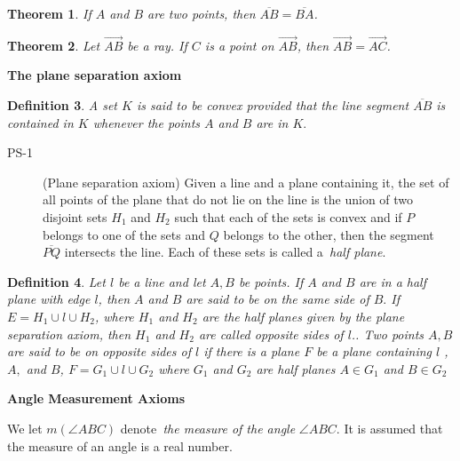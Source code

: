 \documentclass[12pt]{article}
\newtheorem{theorem}{Theorem}
\newtheorem{definition}[theorem]{Definition}
\begin{document}
\begin{theorem}
If $A$ and $B$ are two points, then $\overline{AB}=\overline{BA}$.
\end{theorem}

\begin{theorem}
Let $\overrightarrow{AB}$ be a ray. If $C$ is a point on $\overrightarrow{AB}
$, then $\overrightarrow{AB}=\overrightarrow{AC}$.\medskip 
\end{theorem}

\textbf{The plane separation axiom\smallskip }

\begin{definition}
A set $K$ is said to be \emph{convex} provided that the line segment $%
\overline{AB}$ is contained in $K$ whenever the points $A$ and $B$ are in $K.
$
\end{definition}

\begin{description}
\item[PS-1]  (Plane separation axiom) Given a line and a plane containing
it, the set of all points of the plane that do not lie on the line is the
union of two disjoint sets $H_{1}$ and $H_{2}$ such that each of the sets is
convex and if $P$ belongs to one of the sets and $Q$ belongs to the other,
then the segment $\overline{PQ}$ intersects the line. Each of these sets is
called a\emph{\ half plane}.
\end{description}

\begin{definition}
Let $l$ be a line and let $A,B$ be points. If $A$ and $B$ are in a half
plane with edge $l$, then $A$ and $B$ are said to be on the same side of $B.$
If $E=H_{1}\cup l\cup H_{2}$, where $H_{1}$ and $H_{2}$ are the half planes
given by the plane separation axiom, then $H_{1}$ and $H_{2}$ are called
opposite sides of $l$.. Two points $A,B$ are said to be on opposite sides of 
$l$ if there is a plane $F$ be a plane containing $l$ , $A,$ and $B$, $%
F=G_{1}\cup l\cup G_{2}$ where $G_{1}$ and $G_{2}$ are half planes $A\in
G_{1}$ and $B\in G_{2}$
\end{definition}

\textbf{Angle Measurement Axioms\medskip }

We let $m(\angle ABC)$ denote\emph{\ the measure of the angle }$\angle ABC.$
It is assumed that the measure of an angle is a real number.
\end{document}
